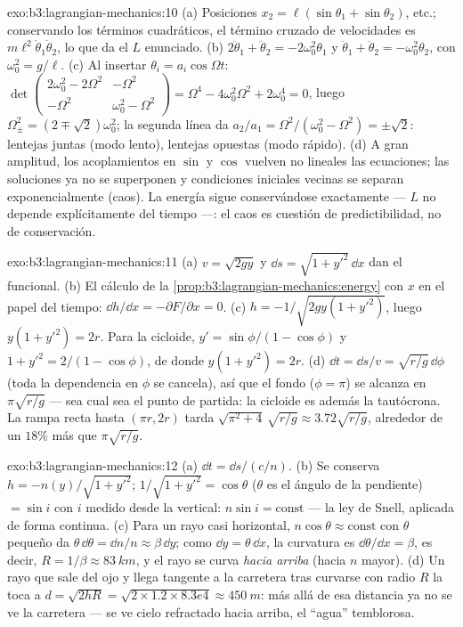 \begin{solution}{exo:b3:lagrangian-mechanics:10}
(a) Posiciones $x_2 = \ell(\sin\theta_1 + \sin\theta_2)$, etc.; conservando
los términos cuadráticos, el término cruzado de velocidades es
$m\ell^2\dot\theta_1\dot\theta_2$, lo que da el $L$ enunciado. (b)
$2\ddot\theta_1 + \ddot\theta_2 = -2\omega_0^2\theta_1$ y
$\ddot\theta_1 + \ddot\theta_2 = -\omega_0^2\theta_2$, con $\omega_0^2
= g/\ell$. (c) Al insertar $\theta_i = a_i\cos\Omega t$:
$\det\begin{pmatrix} 2\omega_0^2 - 2\Omega^2 & -\Omega^2\\ -\Omega^2 &
\omega_0^2 - \Omega^2\end{pmatrix} = \Omega^4 - 4\omega_0^2\Omega^2 +
2\omega_0^4 = 0$, luego $\Omega_\pm^2 = (2 \mp \sqrt2)\omega_0^2$; la
segunda línea da $a_2/a_1 = \Omega^2/(\omega_0^2 - \Omega^2) =
\pm\sqrt2$: lentejas juntas (modo lento), lentejas opuestas (modo rápido).
(d) A gran amplitud, los acoplamientos en $\sin$ y $\cos$ vuelven no
lineales las ecuaciones; las soluciones ya no se superponen y condiciones
iniciales vecinas se separan exponencialmente (caos). La energía sigue
conservándose exactamente --- $L$ no depende explícitamente del tiempo ---:
el caos es cuestión de predictibilidad, no de conservación.
\end{solution}

\begin{solution}{exo:b3:lagrangian-mechanics:11}
(a) $v = \sqrt{2gy}$ y $\dd s = \sqrt{1 + y'^2}\,\dd x$ dan el funcional.
(b) El cálculo de la
\cref{prop:b3:lagrangian-mechanics:energy} con $x$ en el papel del tiempo: $\dd
h/\dd x = -\partial F/\partial x = 0$. (c) $h = -1/\sqrt{2gy(1 +
y'^2)}$, luego $y(1 + y'^2) = 2r$. Para la cicloide, $y' =
\sin\phi/(1 - \cos\phi)$ y $1 + y'^2 = 2/(1 - \cos\phi)$, de donde
$y(1 + y'^2) = 2r$. (d) $\dd t = \dd s/v = \sqrt{r/g}\,\dd\phi$ (toda la
dependencia en $\phi$ se cancela), así que el fondo ($\phi = \pi$) se
alcanza en $\pi\sqrt{r/g}$ --- sea cual sea el punto de partida: la cicloide
es además la tautócrona. La rampa recta hasta $(\pi r, 2r)$ tarda $\sqrt{\pi^2
+ 4}\,\sqrt{r/g} \approx 3.72\sqrt{r/g}$, alrededor de un $18\%$ más que
$\pi\sqrt{r/g}$.
\end{solution}

\begin{solution}{exo:b3:lagrangian-mechanics:12}
(a) $\dd t = \dd s/(c/n)$. (b) Se conserva $h = -n(y)/\sqrt{1 + y'^2}$;
$1/\sqrt{1 + y'^2} = \cos\theta$ ($\theta$ es el ángulo de la pendiente)
$= \sin i$ con $i$ medido desde la vertical: $n\sin i = \text{const}$ ---
la ley de Snell, aplicada de forma continua. (c) Para un rayo casi
horizontal, $n\cos\theta \approx \text{const}$ con $\theta$ pequeño da
$\theta\,\dd\theta = \dd n/n \approx \beta\,\dd y$; como $\dd y =
\theta\,\dd x$, la curvatura es $\dd\theta/\dd x = \beta$, es decir, $R =
1/\beta \approx \qty{83}{km}$, y el rayo se curva \emph{hacia arriba} (hacia
$n$ mayor). (d) Un rayo que sale del ojo y llega tangente a la carretera
tras curvarse con radio $R$ la toca a $d = \sqrt{2hR} = \sqrt{2 \times 1.2 \times
8.3e4} \approx \qty{450}{m}$: más allá de esa distancia ya no se ve la
carretera --- se ve cielo refractado hacia arriba, el ``agua'' temblorosa.
\end{solution}

